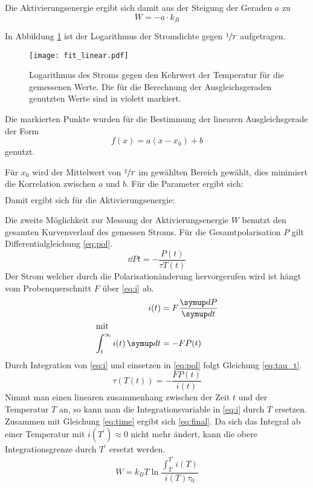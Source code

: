 Die Aktivierungsenergie ergibt sich damit aus der Steigung der Geraden $a$ zu
\begin{equation}
  W = - a \cdot k_B
\end{equation}

In Abbildung \ref{fig:lnj} ist der Logarithmus der Stromdichte gegen $\sfrac{1}{T}$ aufgetragen.

\begin{figure}
  \texttt{[image: fit\_linear.pdf]}
  \caption{%
    Logarithmus des Stroms gegen den Kehrwert der Temperatur für die gemessenen Werte.
    Die für die Berechnung der Ausgleichsgeraden genutzten Werte sind in violett markiert.
  }
  \label{fig:lnj}
\end{figure}

Die markierten Punkte wurden für die Bestimmung der linearen Ausgleichsgerade der Form
\begin{equation}
  f(x) = a (x - x_0) + b
\end{equation}
genutzt.

Für $x_0$ wird der Mittelwert von $\sfrac{1}{T}$ im gewählten Bereich gewählt, dies minimiert die Korrelation zwischen $a$ und $b$.
Für die Parameter ergibt sich:
\begin{align}
  
\end{align}
Damit ergibt sich für die Aktivierungsenergie:
\begin{equation}
  
\end{equation}

Die zweite Möglichkeit zur Messung der Aktivierungsenergie $W$ benutzt den gesamten Kurvenverlauf des gemessen Stroms.
Für die Gesamtpolarisation $P$ gilt Differentialgleichung \eqref{eq:pol}.
\begin{equation}
  \dd{P}{t} = - \frac{P(t)}{\tau{T(t)}}
  \label{eq:pol}
\end{equation}
Der Strom welcher durch die Polarisationänderung hervorgerufen wird ist hängt vom Probenquerschnitt $F$ über \eqref{eq:i} ab.
\begin{align}
  i(t) &= F \dd{P}{t} \\
  \shortintertext{mit}
  \int_t^{\infty} i(t) \dif{t} &= -FP(t)
  \label{eq:i}
\end{align}
Durch Integration von  \eqref{eq:i} und einsetzen in \eqref{eq:pol} folgt Gleichung \eqref{eq:tau_t}.
\begin{equation}
  \tau(T(t)) = -\frac{F P(t)}{i(t)}
  \label{eq:tau_t}
\end{equation}
Nimmt man einen linearen zusammenhang zwischen der Zeit $t$ und der Temperatur $T$ an, so kann man die Integrationsvariable in \eqref{eq:i} durch $T$ ersetzen.
Zusammen mit Gleichung \eqref{eq:time} ergibt sich \eqref{eq:final}. Da sich das Integral ab einer Temperatur mit $i(T^{\prime}) \approx 0$ nicht mehr ändert,
kann die obere Integrationsgrenze durch $T^{\prime}$ ersetzt werden.
\begin{equation}
  W = k_B T \ln \frac{\int_T^{T^{\prime}} i(T)}{ i(T) \tau_0}
  \label{eq:final}
\end{equation}
